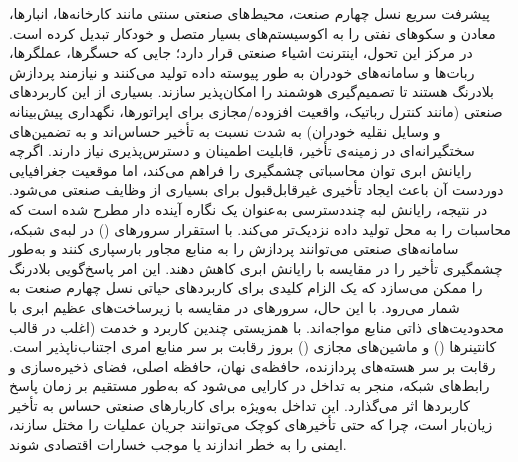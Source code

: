 پیشرفت سریع نسل‌ چهارم صنعت، محیط‌های صنعتی سنتی مانند کارخانه‌ها، انبارها، معادن و سکوهای نفتی را به اکوسیستم‌های بسیار متصل و خودکار تبدیل کرده است.  در مرکز این تحول، اینترنت اشیاء صنعتی  قرار دارد؛ جایی که حسگرها، عملگرها، ربات‌ها و سامانه‌های خودران به طور پیوسته داده تولید می‌کنند و نیازمند پردازش بلادرنگ هستند تا تصمیم‌گیری هوشمند را امکان‌پذیر سازند. بسیاری از این کاربردهای صنعتی (مانند کنترل رباتیک، واقعیت افزوده/مجازی  برای اپراتورها، نگهداری پیش‌بینانه و وسایل نقلیه خودران) به شدت نسبت به تأخیر حساس‌اند و به تضمین‌های سختگیرانه‌ای در زمینه‌ی تأخیر، قابلیت اطمینان و دسترس‌پذیری نیاز دارند.
اگرچه رایانش ابری توان محاسباتی چشمگیری را فراهم می‌کند، اما موقعیت جغرافیایی دوردست آن باعث ایجاد تأخیری غیرقابل‌قبول برای بسیاری از وظایف صنعتی می‌شود. در نتیجه، رایانش لبه چنددسترسی  به‌عنوان یک نگاره آینده دار مطرح شده است که محاسبات را به محل تولید داده نزدیک‌تر می‌کند. با استقرار سرورهای ()  در لبه‌ی شبکه، سامانه‌های صنعتی می‌توانند پردازش را به منابع مجاور بار‌سپاری کنند و به‌طور چشمگیری تأخیر را در مقایسه با رایانش ابری کاهش دهند. این امر پاسخ‌گویی بلادرنگ را ممکن می‌سازد که یک الزام کلیدی برای کاربردهای حیاتی نسل چهارم صنعت به شمار می‌رود.
با این حال، سرورهای  در مقایسه با زیرساخت‌های عظیم ابری با محدودیت‌های ذاتی منابع مواجه‌اند. با همزیستی چندین کاربرد و خدمت (اغلب در قالب کانتینرها () و ماشین‌های مجازی () بروز رقابت بر سر منابع امری اجتناب‌ناپذیر است. رقابت بر سر هسته‌های پردازنده، حافظه‌ی نهان، حافظه اصلی، فضای ذخیره‌سازی و رابط‌های شبکه، منجر به تداخل در کارایی می‌شود که به‌طور مستقیم بر زمان پاسخ کاربردها اثر می‌گذارد. این تداخل به‌ویژه برای کاربارهای صنعتی حساس به تأخیر زیان‌بار است، چرا که حتی تأخیرهای کوچک می‌توانند جریان عملیات را مختل سازند، ایمنی را به خطر اندازند یا موجب خسارات اقتصادی شوند.

